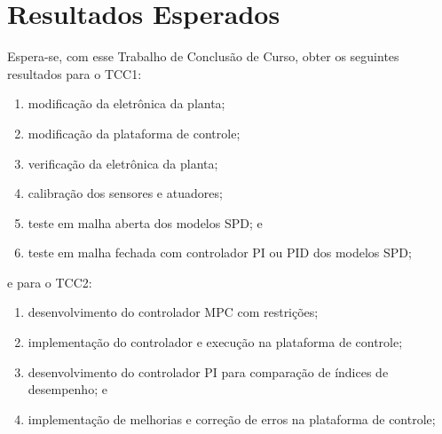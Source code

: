 
\chapter{Resultados Esperados}%
\label{sec:expected-results}

Espera-se, com esse Trabalho de Conclusão de Curso, obter os seguintes
resultados para o TCC1:

\begin{enumerate}
      \item modificação da eletrônica da planta;
      \item modificação da plataforma de controle;
      \item verificação da eletrônica da planta;
      \item calibração dos sensores e atuadores;
      \item teste em malha aberta dos modelos SPD\@; e
      \item teste em malha fechada com controlador PI ou PID dos modelos SPD\@;
\end{enumerate}

e para o TCC2:

\begin{enumerate}
      \item desenvolvimento do controlador MPC com restrições;
      \item implementação do controlador e execução na plataforma de controle;
      \item desenvolvimento do controlador PI para comparação de índices de
            desempenho; e
      \item implementação de melhorias e correção de erros na plataforma de
            controle;
\end{enumerate}
